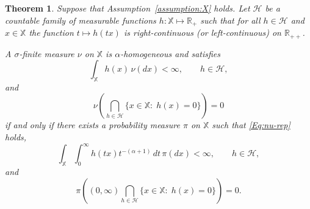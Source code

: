 \documentclass[12pt]{amsart}
\numberwithin{equation}{section}
\numberwithin{figure}{section}
\theoremstyle{plain} \newtheorem{theorem}{Theorem}[section]
\theoremstyle{plain} \newtheorem{proposition}[theorem]{Proposition}
\theoremstyle{plain} \newtheorem{lemma}[theorem]{Lemma}
\theoremstyle{plain} \newtheorem{corollary}[theorem]{Corollary}
\theoremstyle{definition} \newtheorem{definition}[theorem]{Definition}
\theoremstyle{definition} \newtheorem{notation}[theorem]{Notation}
\theoremstyle{remark} \newtheorem{remark}[theorem]{Remark}
\theoremstyle{remark} \newtheorem{example}[theorem]{Example}
\theoremstyle{definition} \newtheorem{assumption}{Assumption}
\newcommand{\bR}{\mathbb{R}}
\newcommand{\bX}{\mathbb{X}}
\newcommand{\cH}{\mathcal{H}}
\begin{document}
\begin{theorem}
  \label{thr:general-polar}
  Suppose that Assumption~\ref{assumption:X} holds.  Let $\cH$ be a
  countable family of measurable functions $h:\bX\mapsto\bR_+$ such
  that for all $h \in \cH$ and $x \in \bX$ the function $ t \mapsto
  h(tx)$ is right-continuous (or left-continuous) on $\bR_{++}$.

  A $\sigma$-finite measure $\nu$ on $\bX$ is $\alpha$-homogeneous and
  satisfies
  \begin{equation}
    \label{eq:nu-h-integral}
    \int_\bX h(x) \, \nu(dx) <\infty,\qquad h\in\cH,
  \end{equation}
  and 
  \begin{equation}
    \label{Eq:nu-support-h}
    \nu\left(\bigcap_{h\in\cH} \{x\in\bX:\; h(x)=0\}\right)=0
  \end{equation}
  if and only if there exists a probability measure $\pi$ on $\bX$
  such that \eqref{Eq:nu-rep} holds, 
  \begin{equation}
    \label{Eq:levy-condition-pi-general}
    \int_{\bX}\int_0^\infty h(tx) t^{-(\alpha+1)} \, dt \, \pi(dx) <\infty,
    \qquad h\in\cH,
  \end{equation}
  and 
  \begin{displaymath}
    \pi\left((0,\infty) \bigcap_{h \in \cH} \{x\in\bX:\; h(x)=0\}\right)=0. 
  \end{displaymath}
\end{theorem}
\end{document}
